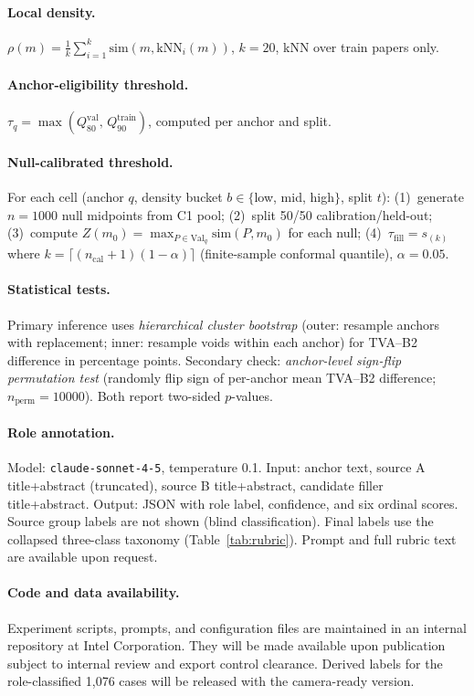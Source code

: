 \documentclass[11pt,twocolumn]{article}
\newcommand{\taufill}{\tau_{\mathrm{fill}}}
\newcommand{\tauanchor}{\tau_{q}}
\begin{document}
\paragraph{Local density.}
$\rho(m) = \frac{1}{k}\sum_{i=1}^{k}\mathrm{sim}(m, \mathrm{kNN}_i(m))$, $k{=}20$,
kNN over train papers only.

\paragraph{Anchor-eligibility threshold.}
$\tauanchor = \max(Q_{80}^{\mathrm{val}},\, Q_{90}^{\mathrm{train}})$,
computed per anchor and split.

\paragraph{Null-calibrated threshold.}
For each cell (anchor $q$, density bucket $b \in \{$low, mid, high$\}$, split $t$):
(1)~generate $n{=}1000$ null midpoints from C1 pool;
(2)~split 50/50 calibration/held-out;
(3)~compute $Z(m_0) = \max_{P \in \mathrm{Val}_q}\mathrm{sim}(P,m_0)$ for each null;
(4)~$\taufill = s_{(k)}$ where $k = \lceil(n_\mathrm{cal}+1)(1-\alpha)\rceil$
(finite-sample conformal quantile), $\alpha{=}0.05$.

\paragraph{Statistical tests.}
Primary inference uses \emph{hierarchical cluster bootstrap} (outer: resample anchors
with replacement; inner: resample voids within each anchor) for TVA--B2 difference in
percentage points. Secondary check: \emph{anchor-level sign-flip permutation test}
(randomly flip sign of per-anchor mean TVA--B2 difference; $n_\mathrm{perm}{=}10000$).
Both report two-sided $p$-values.

\paragraph{Role annotation.}
Model: \texttt{claude-sonnet-4-5}, temperature 0.1.
Input: anchor text, source A title+abstract (truncated), source B title+abstract,
candidate filler title+abstract.
Output: JSON with role label, confidence, and six ordinal scores.
Source group labels are not shown (blind classification).
Final labels use the collapsed three-class taxonomy (Table~\ref{tab:rubric}).
Prompt and full rubric text are available upon request.

\paragraph{Code and data availability.}
Experiment scripts, prompts, and configuration files are maintained in an
internal repository at Intel Corporation. They will be made available
upon publication subject to internal review and export control clearance.
Derived labels for the role-classified 1,076 cases will be released with the
camera-ready version.
\end{document}
